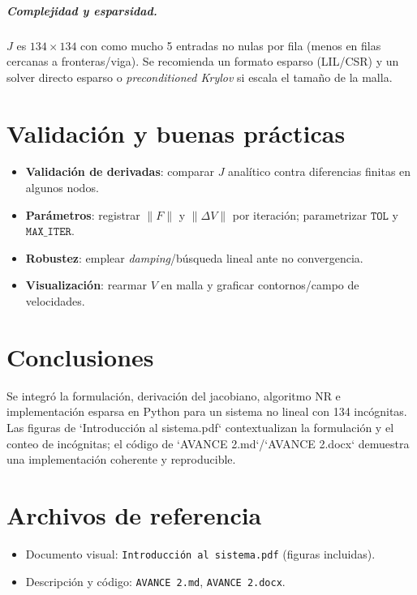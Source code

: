\documentclass[12pt,a4paper]{report}
\theoremstyle{definition}
\begin{document}
\paragraph{Complejidad y esparsidad.} \(J\) es \(134\times 134\) con como mucho 5 entradas no nulas por fila (menos en filas cercanas a fronteras/viga). Se recomienda un formato esparso (LIL/CSR) y un solver directo esparso o \emph{preconditioned Krylov} si escala el tamaño de la malla.

\chapter{Validación y buenas prácticas}
\begin{itemize}
  \item \textbf{Validación de derivadas}: comparar \(J\) analítico contra diferencias finitas en algunos nodos.
  \item \textbf{Parámetros}: registrar \(\|F\|\) y \(\|\Delta V\|\) por iteración; parametrizar \(\texttt{TOL}\) y \(\texttt{MAX\_ITER}\).
  \item \textbf{Robustez}: emplear \emph{damping}/búsqueda lineal ante no convergencia.
  \item \textbf{Visualización}: rearmar \(V\) en malla y graficar contornos/campo de velocidades.
\end{itemize}

\chapter{Conclusiones}
Se integró la formulación, derivación del jacobiano, algoritmo NR e implementación esparsa en Python para un sistema no lineal con 134 incógnitas. Las figuras de `Introducción al sistema.pdf` contextualizan la formulación y el conteo de incógnitas; el código de `AVANCE 2.md`/`AVANCE 2.docx` demuestra una implementación coherente y reproducible.

\chapter*{Archivos de referencia}
\begin{itemize}
  \item Documento visual: \texttt{Introducción al sistema.pdf} (figuras incluidas).
  \item Descripción y código: \texttt{AVANCE 2.md}, \texttt{AVANCE 2.docx}.
\end{itemize}
\end{document}
